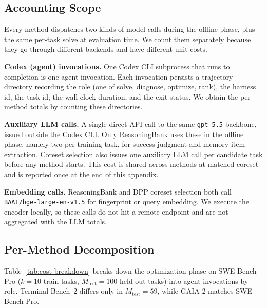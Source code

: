 \documentclass{llmxive}
\begin{document}
\subsection{Accounting Scope}

Every method dispatches two kinds of model calls during the offline phase, plus the same per-task solve at evaluation time.
We count them separately because they go through different backends and have different unit costs.

\noindent\textbf{Codex (agent) invocations.}
One Codex CLI subprocess that runs to completion is one agent invocation.
Each invocation persists a trajectory directory recording the role (one of solve, diagnose, optimize, rank), the harness id, the task id, the wall-clock duration, and the exit status.
We obtain the per-method totals by counting these directories.

\noindent\textbf{Auxiliary LLM calls.}
A single direct API call to the same \texttt{gpt-5.5} backbone, issued outside the Codex CLI.
Only ReasoningBank uses these in the offline phase, namely two per training task, for success judgment and memory-item extraction.
Coreset selection also issues one auxiliary LLM call per candidate task before any method starts. This cost is shared across methods at matched coreset and is reported once at the end of this appendix.

\noindent\textbf{Embedding calls.}
ReasoningBank and DPP coreset selection both call \texttt{BAAI/bge-large-en-v1.5} \citep{xiao2023cpack} for fingerprint or query embedding.
We execute the encoder locally, so these calls do not hit a remote endpoint and are not aggregated with the LLM totals.

\subsection{Per-Method Decomposition}

Table~\ref{tab:cost-breakdown} breaks down the optimization phase on SWE-Bench Pro ($k=10$ train tasks, $M_{\mathrm{test}}=100$ held-out tasks) into agent invocations by role.
Terminal-Bench~2 differs only in $M_{\mathrm{test}}=59$, while GAIA-2 matches SWE-Bench Pro.
\end{document}
